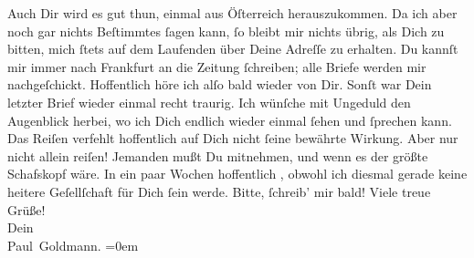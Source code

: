 \begin{ledgroupsized}[t]{13cm}
               Auch Dir wird es gut thun, einmal aus Öſterreich herauszukommen. Da ich aber noch gar nichts Beſtimmtes ſagen
               kann, ſo bleibt mir nichts übrig, als Dich zu bitten, mich ſtets auf dem Laufenden
               über Deine Adreſſe zu erhalten. Du kannſt mir immer nach Frankfurt an die Zeitung ſchreiben; alle Briefe werden mir nachgeſchickt. {\pb}Hoffentlich höre ich alſo bald wieder von Dir.\pend
           \pstart
           Sonſt war Dein letzter Brief  wieder einmal recht
               traurig. Ich wünſche mit Ungeduld den Augenblick herbei, wo ich Dich endlich wieder
               einmal  ſehen und ſprechen kann. Das Reiſen verfehlt hoffentlich auf Dich nicht ſeine
               bewährte Wirkung. Aber nur nicht allein reiſen! Jemanden mußt Du mitnehmen, und wenn
               es der größte Schafskopf wäre. In ein paar Wochen hoffentlich \label{K_L02878-6v}\label{K_L02878-6h},
                  \strikeout{\textcolor{gray}{×}\-\textcolor{gray}{×}} obwohl ich diesmal gerade keine heitere Geſellſchaft für Dich ſein werde.\pend
           \pstart
           Bitte, ſchreib’ mir bald!\pend
           \pstart
           Viele treue Grüße! {\\[\baselineskip]}Dein {\\[\baselineskip]}\spacefill\mbox{Paul Goldmann.}\pend
           \leftskip=0em{}
         
         \endnumbering{}\end{ledgroupsized}  \newcommand{\dateiname}{L02878}\newcommand{\titel}{Paul Goldmann an Arthur Schnitzler, 2. 7. 1899}\newcommand{\editorInnen}{Martin Anton Müller und Laura Untner}
      